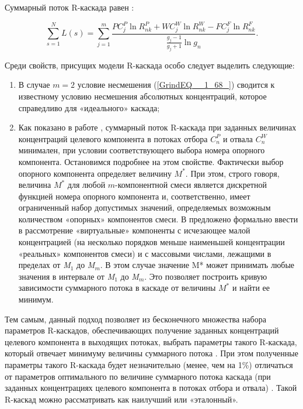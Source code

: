 Суммарный поток R-каскада равен \cite{sulaberidzeTeoriyaKaskadovDlya2011}:

\begin{equation} \label{GrindEQ__1_77_} 
  \sum _{s=1}^{N}L(s) =\sum _{j=1}^{m}\frac{PC_{j}^{P} \ln R_{nk}^{P} +WC_{j}^{W} \ln R_{nk}^{W} -FC_{j}^{F} \ln R_{nk}^{F} }{\frac{g_{j} -1}{g_{j} +1} \ln g_{n} }  .               
\end{equation} 

Среди свойств, присущих модели R-каскада особо следует выделить следующие:

\begin{enumerate}
  \item В случае $m=2$ условие несмешения (\ref{GrindEQ__1_68_}) сводится к известному условию несмешения абсолютных концентраций, которое справедливо для «идеального» каскада;
  \item	Как показано в работе \cite{songComparativeStudyModel2010}, суммарный поток R-каскада при заданных величинах концентраций целевого компонента в потоках отбора $C_{n}^{P}$ и отвала $C_{n}^{W}$ минимален, при условии соответствующего выбора номера опорного компонента. Остановимся подробнее на этом свойстве. Фактически выбор опорного компонента определяет величину $M^{*}$. При этом, строго говоря, величина $M^{*}$ для любой $m$-компонентной смеси является дискретной функцией номера опорного компонента и, соответственно, имеет ограниченный набор допустимых значений, определяемых возможным количеством «опорных» компонентов смеси. В \cite{sulaberidzeSravnenieOptimalnyhModelnyh2008} предложено формально ввести в рассмотрение «виртуальные» компоненты с исчезающее малой концентрацией (на несколько порядков меньше наименьшей концентрации «реальных» компонентов смеси) и с массовыми числами, лежащими в пределах от \textit{M${}_{1}$} до \textit{M${}_{m}$}. В этом случае значение M* может принимать любые значения в интервале от \textit{M${}_{1}$} до \textit{M${}_{m}$}. Это позволяет построить кривую зависимости суммарного потока в каскаде от величины $M^{*}$ и найти ее минимум. 
\end{enumerate}
  
Тем самым, данный подход позволяет из бесконечного множества набора параметров R-каскадов, обеспечивающих получение заданных концентраций целевого компонента в выходящих потоках, выбрать параметры такого R-каскада, который отвечает минимуму величины суммарного потока \cite{sulaberidzeSravnenieOptimalnyhModelnyh2008}. При этом полученные параметры такого R-каскада будет незначительно (менее, чем на 1\%) отличаться от параметров оптимального по величине суммарного потока каскада (при заданных концентрациях целевого компонента в потоках отбора и отвала) \cite{songComparativeStudyModel2010}. Такой R-каскад можно рассматривать как наилучший или «эталонный».

